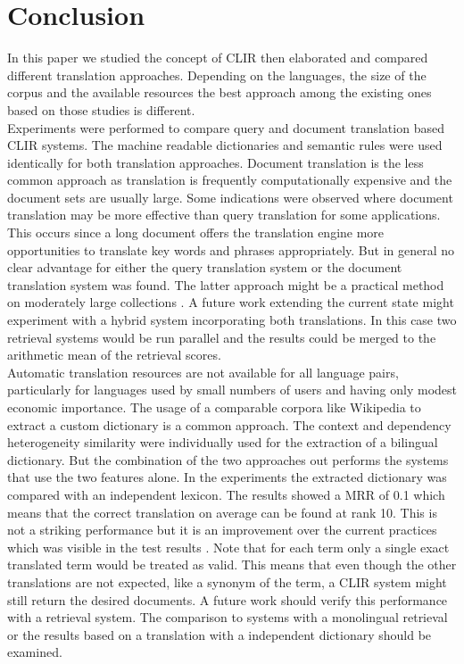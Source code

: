 \documentclass[journal]{IEEEtran}
\begin{document}
\section{Conclusion}
In this paper we studied the concept of CLIR then elaborated and compared different translation approaches.
Depending on the languages, the size of the corpus and the available resources the best approach among the existing ones based on those studies is different.
\mbox{}\\

Experiments were performed to compare query and document translation based CLIR systems.
The machine readable dictionaries and semantic rules were used identically for both translation approaches.
Document translation is the less common approach as translation is frequently computationally expensive and the document sets are usually large.
Some indications were observed where document translation may be more effective than query translation for some applications.
This occurs since a long document offers the translation engine more opportunities to translate key words and phrases appropriately.
But in general no clear advantage for either the query translation system or the document translation system was found.
The latter approach might be a practical method on moderately large collections \cite{oard97b}.
A future work extending the current state might experiment with a hybrid system incorporating both translations.
In this case two retrieval systems would be run parallel and the results could be merged to the arithmetic mean of the retrieval scores.
\mbox{}\\

Automatic translation resources are not available for all language pairs, particularly for languages used by small numbers of users and having only modest economic importance.
The usage of a comparable corpora like Wikipedia to extract a custom dictionary is a common approach.
The context and dependency heterogeneity similarity were individually used for the extraction of a bilingual dictionary.
But the combination of the two approaches out performs the systems that use the two features alone.
In the experiments the extracted dictionary was compared with an independent lexicon.
The results showed a MRR of 0.1 which means that the correct translation on average can be found at rank 10.
This is not a striking performance but it is an improvement over the current practices which was visible in the test results \cite{yu09}.
Note that for each term only a single exact translated term would be treated as valid.
This means that even though the other translations are not expected, like a synonym of the term, a CLIR system might still return the desired documents.
A future work should verify this performance with a retrieval system.
The comparison to systems with a monolingual retrieval or the results based on a translation with a independent dictionary should be examined.
\mbox{}\\
\end{document}
